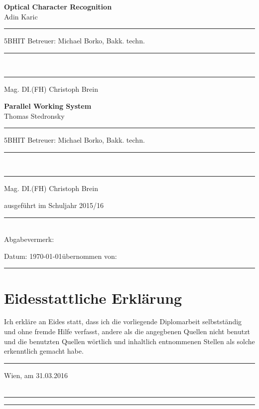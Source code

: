 \documentclass[a4paper,12pt,twoside,openany]{book}
\newcommand\blankpage{%
    \null
    \thispagestyle{empty}%
    \addtocounter{page}{-1}%
    \newpage}
\begin{document}
\begin{titlepage}
\textbf{Optical Character Recognition}\\
Adin Karic \rule[-0.2cm]{1.8cm}{0pt} 5BHIT \hfill Betreuer: Michael Borko, Bakk. techn. \rule[-0.2cm]{0.4cm}{0pt}\\
\rule[-0.2cm]{9.8cm}{0pt} Mag. DI.(FH) Christoph Brein

\textbf{Parallel Working System}\\
Thomas Stedronsky \rule[-0.2cm]{0.2cm}{0pt} 5BHIT \hfill Betreuer: Michael Borko, Bakk. techn. \rule[-0.2cm]{0.4cm}{0pt}\\
\rule[-0.2cm]{9.8cm}{0pt} Mag. DI.(FH) Christoph Brein

\vspace{15mm}

ausgeführt im Schuljahr 2015/16

\rule{1.0\textwidth}{0.3mm}\\
Abgabevermerk: 

Datum: \today \hfill \hfill übernommen von:\rule[-0.2cm]{3cm}{0pt}

\begin{center}


\afterpage{\blankpage}

\end{center}
\end{titlepage}



\thispagestyle{empty}
%
\section*{Eidesstattliche Erklärung}
Ich erkläre an Eides statt, dass ich die vorliegende Diplomarbeit selbstständig und ohne fremde Hilfe verfasst, andere als die angegbenen Quellen nicht benutzt und die benutzten Quellen wörtlich und inhaltlich entnommenen Stellen als solche erkenntlich gemacht habe. \\

\rule[-0.2cm]{1cm}{0pt} Wien, am 31.03.2016 \\ \\

\hfill \hfill \rule[-0.2cm]{6cm}{0.5pt} \rule[-0.2cm]{2cm}{0pt}
\end{document}
